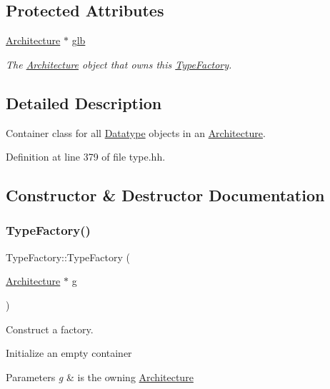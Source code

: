 \subsection*{Protected Attributes}
\begin{DoxyCompactItemize}
\item 
\mbox{\hyperlink{class_architecture}{Architecture}} $\ast$ \mbox{\hyperlink{class_type_factory_a0652ec9d4b9d9d0943d1fbffe9b9c740}{glb}}
\begin{DoxyCompactList}\small\item\em The \mbox{\hyperlink{class_architecture}{Architecture}} object that owns this \mbox{\hyperlink{class_type_factory}{Type\+Factory}}. \end{DoxyCompactList}\end{DoxyCompactItemize}


\subsection{Detailed Description}
Container class for all \mbox{\hyperlink{class_datatype}{Datatype}} objects in an \mbox{\hyperlink{class_architecture}{Architecture}}. 

Definition at line 379 of file type.\+hh.



\subsection{Constructor \& Destructor Documentation}
\mbox{\label{class_type_factory_a68a14752ee51f674664cce90522fe559}} 
\subsubsection{\texorpdfstring{TypeFactory()}{TypeFactory()}}
{\footnotesize\ttfamily Type\+Factory\+::\+Type\+Factory (\begin{DoxyParamCaption}\item[{\mbox{\hyperlink{class_architecture}{Architecture}} $\ast$}]{g }\end{DoxyParamCaption})}



Construct a factory. 

Initialize an empty container 
\begin{DoxyParams}{Parameters}
{\em g} & is the owning \mbox{\hyperlink{class_architecture}{Architecture}} \\
\hline
\end{DoxyParams}


